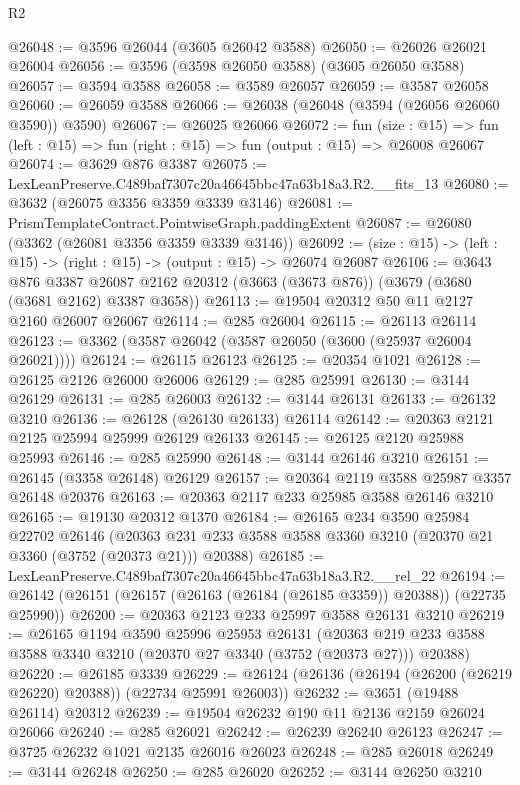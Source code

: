 \begin{lexlean}{R2}
\begin{coremodule}
@26048 := @3596 @26044 (@3605 @26042 @3588)
@26050 := @26026 @26021 @26004
@26056 := @3596 (@3598 @26050 @3588) (@3605 @26050 @3588)
@26057 := @3594 @3588
@26058 := @3589 @26057
@26059 := @3587 @26058
@26060 := @26059 @3588
@26066 := @26038 (@26048 (@3594 (@26056 @26060 @3590)) @3590)
@26067 := @26025 @26066
@26072 := fun (size : @15) =>
  fun (left : @15) => fun (right : @15) => fun (output : @15) => @26008 @26067
@26074 := @3629 @876 @3387
@26075 := LexLeanPreserve.C489baf7307c20a46645bbc47a63b18a3.R2.__fits_13
@26080 := @3632 (@26075 @3356 @3359 @3339 @3146)
@26081 := PrismTemplateContract.PointwiseGraph.paddingExtent
@26087 := @26080 (@3362 (@26081 @3356 @3359 @3339 @3146))
@26092 := (size : @15) -> (left : @15) -> (right : @15) -> (output : @15) -> @26074 @26087
@26106 := @3643
    @876
    @3387
    @26087
    @2162
    @20312
    (@3663 (@3673 @876))
    (@3679 (@3680 (@3681 @2162) @3387 @3658))
@26113 := @19504 @20312 @50 @11 @2127 @2160 @26007 @26067
@26114 := @285 @26004
@26115 := @26113 @26114
@26123 := @3362 (@3587 @26042 (@3587 @26050 (@3600 (@25937 @26004 @26021))))
@26124 := @26115 @26123
@26125 := @20354 @1021
@26128 := @26125 @2126 @26000 @26006
@26129 := @285 @25991
@26130 := @3144 @26129
@26131 := @285 @26003
@26132 := @3144 @26131
@26133 := @26132 @3210
@26136 := @26128 (@26130 @26133) @26114
@26142 := @20363 @2121 @2125 @25994 @25999 @26129 @26133
@26145 := @26125 @2120 @25988 @25993
@26146 := @285 @25990
@26148 := @3144 @26146 @3210
@26151 := @26145 (@3358 @26148) @26129
@26157 := @20364 @2119 @3588 @25987 @3357 @26148 @20376
@26163 := @20363 @2117 @233 @25985 @3588 @26146 @3210
@26165 := @19130 @20312 @1370
@26184 := @26165
    @234
    @3590
    @25984
    @22702
    @26146
    (@20363 @231 @233 @3588 @3588 @3360 @3210 (@20370 @21 @3360 (@3752 (@20373 @21))) @20388)
@26185 := LexLeanPreserve.C489baf7307c20a46645bbc47a63b18a3.R2.__rel_22
@26194 := @26142 (@26151 (@26157 (@26163 (@26184 (@26185 @3359)) @20388)) (@22735 @25990))
@26200 := @20363 @2123 @233 @25997 @3588 @26131 @3210
@26219 := @26165
    @1194
    @3590
    @25996
    @25953
    @26131
    (@20363 @219 @233 @3588 @3588 @3340 @3210 (@20370 @27 @3340 (@3752 (@20373 @27))) @20388)
@26220 := @26185 @3339
@26229 := @26124 (@26136 (@26194 (@26200 (@26219 @26220) @20388)) (@22734 @25991 @26003))
@26232 := @3651 (@19488 @26114) @20312
@26239 := @19504 @26232 @190 @11 @2136 @2159 @26024 @26066
@26240 := @285 @26021
@26242 := @26239 @26240 @26123
@26247 := @3725 @26232 @1021 @2135 @26016 @26023
@26248 := @285 @26018
@26249 := @3144 @26248
@26250 := @285 @26020
@26252 := @3144 @26250 @3210

\end{coremodule}
\end{lexlean}
